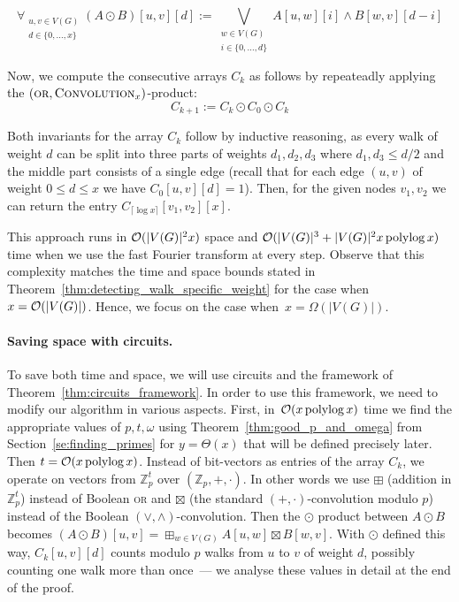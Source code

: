 $$\forall_{\substack{u,v\in V(G)\\ d\in\{0,\ldots,x\}}} (A\odot B)[u,v][d]:=\bigvee_{\substack{w\in V(G) \\  i\in \{0,\ldots,d\}}} A[u,w][i] \wedge B[w,v][d-i]$$

 Now, we compute the consecutive arrays $C_k$ as follows by repeateadly applying the $(\textsc{or},\textsc{Convolution}_x)$-product:
$$C_{k+1}:=C_k \odot C_0 \odot C_k$$

Both invariants for the array $C_k$ follow by inductive reasoning, as every walk of weight $d$ can be split into three parts of weights $d_1,d_2,d_3$ where $d_1,d_3\leq d/2$ and the middle part consists of a single edge (recall that for each edge $(u,v)$ of weight $0 \le d \le x$ we have $C_0[u,v][d] = 1$).
Then, for the given nodes $v_1,v_2$ we can return the entry $C_{\lceil \log x \rceil}[v_1,v_2][x]$.

This approach runs in $\mathcal{O}(|V(G)|^2 x)$ space and $\mathcal{O}(|V(G)|^3+|V(G)|^2 x \operatorname{polylog} x)$ time when we use the fast Fourier transform at every step.
Observe that this complexity matches the time and space bounds stated in Theorem~\ref{thm:detecting_walk_specific_weight} for the case when $x=\mathcal{O}(|V(G)|)$.
Hence, we focus on the case when~$x=\Omega(|V(G)|)$.

\paragraph{Saving space with circuits.} To save both time and space, we will use circuits and the framework of Theorem~\ref{thm:circuits_framework}.
In order to use this framework, we need to modify our algorithm in various aspects.
First, in~$\mathcal{O}(x\operatorname{polylog} x)$ time we find the appropriate values of $p,t,\omega$ using Theorem~\ref{thm:good_p_and_omega} from Section~\ref{se:finding_primes} for $y=\Theta(x)$ that will be defined precisely later.
Then $t=\mathcal{O}(x\operatorname{polylog} x)$.
Instead of bit-vectors as entries of the array $C_k$, we operate on vectors from $\mathbb{Z}_p^t$ over $(\mathbb{Z}_p,+,\cdot)$.
In other words we use $\boxplus$ (addition in $\mathbb{Z}_p^t$) instead of Boolean \textsc{or} and $\boxtimes$ (the standard $(+,\cdot)$-convolution modulo $p$) instead of the Boolean $(\vee,\wedge)$-convolution.
Then the $\odot$ product between $A\odot B$ becomes $(A\odot B)[u,v]=\boxplus_{w\in V(G)} A[u,w] \boxtimes B[w,v]$.
With $\odot$ defined this way, $C_k[u,v][d]$ counts modulo $p$ walks from $u$ to $v$ of weight $d$, possibly counting one walk more than once~--- we analyse these values in detail at the end of the proof.



